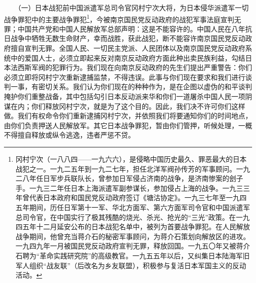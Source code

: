 \documentclass[cn,11pt,chinese]{elegantbook}
\begin{document}
　　（一）日本战犯前中国派遣军总司令官冈村宁次大将，为日本侵华派遣军一切战争罪犯中的主要战争罪犯\footnote[3]{ 冈村宁次（一八八四——一九六六），是侵略中国历史最久、罪恶最大的日本战犯之一。一九二五年到一九二七年，担任北洋军阀孙传芳的军事顾问。一九二八年任日军步兵联队长，曾参加日军侵占济南的战争，是济南惨案的刽子手。一九三二年任日本上海派遣军副参谋长，参加侵占上海的战争。一九三三年曾代表日本政府和国民党反动政府签订《塘沽协定》。一九三七年至一九四五年期间，历任日军第十一军、华北方面军、第六方面军司令官和中国派遣军总司令官，在中国实行了极其残酷的烧光、杀光、抢光的“三光”政策。在一九四五年十二月延安公布的日本战犯名单中，被列为首要战争罪犯。在人民解放战争期间，他曾充当蒋介石的秘密军事顾问，为蒋介石策划向解放区的进攻。一九四九年一月被国民党反动政府宣判无罪，释放回国。一九五〇年又被蒋介石聘为“革命实践研究院”的高级教官。一九五五年以后，又纠集日本陆海军旧军人组织“战友联”（后改名为乡友联盟），积极参与复活日本军国主义的反动活动。}，今被南京国民党反动政府的战犯军事法庭宣判无罪；中国共产党和中国人民解放军总部声明：这是不能容许的。中国人民在八年抗日战争中牺牲无数生命财产，幸而战胜，获此战犯，断不能容许南京国民党反动政府擅自宣判无罪。全国人民、一切民主党派、人民团体以及南京国民党反动政府系统中的爱国人士，必须立即起来反对南京反动政府方面此种出卖民族利益，勾结日本法西斯军阀的犯罪行为。我们现在向南京反动政府的先生们提出严重警告：你们必须立即将冈村宁次重新逮捕监禁，不得违误。此事与你们现在要求和我们进行谈判一事，有密切关系。我们认为你们现在的种种作为，是在企图以虚伪的和平谈判掩护你们重整战备，其中包括勾引日本反动派来华和你们一道屠杀中国人民一项阴谋在内；你们释放冈村宁次，就是为了这个目的。因此，我们决不许可你们这样做。我们有权命令你们重新逮捕冈村宁次，并依照我们将要通知你们的时间地点，由你们负责押送人民解放军。其它日本战争罪犯，暂由你们管押，听候处理，一概不得擅自释放或纵令逃逸，违者严惩不贷。\\
\end{document}
